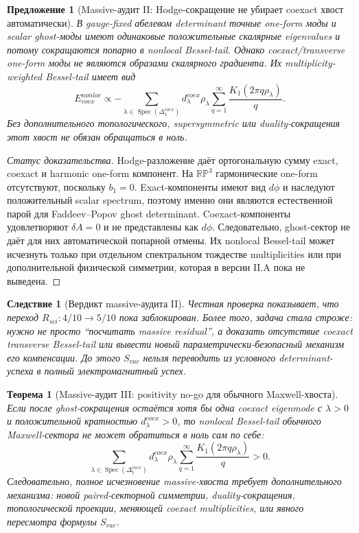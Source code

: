 \documentclass[12pt,a4paper]{report}
\newtheorem{proposition}{Предложение}[chapter]
\newtheorem{theorem}{Теорема}[chapter]
\newtheorem{corollary}{Следствие}[chapter]
\theoremstyle{remark}
\DeclareMathOperator{\Spec}{Spec}
\begin{document}
\begin{proposition}[Massive-аудит II: Hodge-сокращение не убирает coexact хвост автоматически]
В gauge-fixed абелевом determinant точные one-form моды и scalar ghost-моды имеют одинаковые положительные скалярные eigenvalues и потому сокращаются попарно в nonlocal Bessel-tail. Однако coexact/transverse one-form моды не являются образами скалярного градиента. Их multiplicity-weighted Bessel-tail имеет вид
\begin{equation}
    E_{coex}^{nonloc}\propto
    -\sum_{\lambda\in\Spec(\Delta_1^{coex})}
    d^{coex}_{\lambda}\rho_{\lambda}
    \sum_{q=1}^{\infty}\frac{K_1(2\pi q\rho_{\lambda})}{q}.
\end{equation}
Без дополнительного топологического, supersymmetric или duality-сокращения этот хвост не обязан обращаться в ноль.
\end{proposition}

\begin{proof}[Статус доказательства]
Hodge-разложение даёт ортогональную сумму exact, coexact и harmonic one-form компонент. На \(\mathbb{RP}^3\) гармонические one-form отсутствуют, поскольку \(b_1=0\). Exact-компоненты имеют вид \(d\phi\) и наследуют положительный scalar spectrum, поэтому именно они являются естественной парой для Faddeev--Popov ghost determinant. Coexact-компоненты удовлетворяют \(\delta A=0\) и не представлены как \(d\phi\). Следовательно, ghost-сектор не даёт для них автоматической попарной отмены. Их nonlocal Bessel-tail может исчезнуть только при отдельном спектральном тождестве multiplicities или при дополнительной физической симметрии, которая в версии II.A пока не выведена.
\end{proof}

\begin{corollary}[Вердикт massive-аудита II]
Честная проверка показывает, что переход \(R_{sci}:4/10\to5/10\) пока заблокирован. Более того, задача стала строже: нужно не просто ``посчитать massive residual'', а доказать отсутствие coexact transverse Bessel-tail или вывести новый параметрически-безопасный механизм его компенсации. До этого \(S_{vac}\) нельзя переводить из условного determinant-успеха в полный электромагнитный успех.
\end{corollary}


\begin{theorem}[Massive-аудит III: positivity no-go для обычного Maxwell-хвоста]
Если после ghost-сокращения остаётся хотя бы одна coexact eigenmode с \(\lambda>0\) и положительной кратностью \(d^{coex}_{\lambda}>0\), то nonlocal Bessel-tail обычного Maxwell-сектора не может обратиться в ноль сам по себе:
\begin{equation}
    \sum_{\lambda\in\Spec(\Delta_1^{coex})}
    d^{coex}_{\lambda}\rho_{\lambda}
    \sum_{q=1}^{\infty}\frac{K_1(2\pi q\rho_{\lambda})}{q}>0.
\end{equation}
Следовательно, полное исчезновение massive-хвоста требует дополнительного механизма: новой paired-секторной симметрии, duality-сокращения, топологической проекции, меняющей coexact multiplicities, или явного пересмотра формулы \(S_{vac}\).
\end{theorem}
\end{document}
